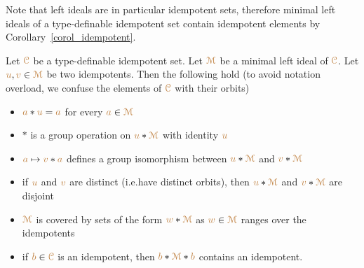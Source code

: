Note that left ideals are in particular idempotent sets, therefore minimal left ideals of a type-definable idempotent set contain idempotent elements by Corollary~\ref{corol_idempotent}.

\begin{lemma}\label{lem_leftideal}
  Let ${\color{brown}\EuScript C}$ be a type-definable idempotent set.
  Let ${\color{brown}\EuScript M}$ be a minimal left ideal of ${\color{brown}\EuScript C}$.
  Let ${\color{brown} u},{\color{brown} v}\in{\color{brown}\EuScript M}$ be two idempotents.
  Then the following hold (to avoid notation overload, we confuse the elements of ${\color{brown}\EuScript C}$ with their orbits)
  \begin{itemize}
    \item [1.] ${\color{brown} a}*{\color{brown} u}={\color{brown} a}$ for every ${\color{brown} a}\in{\color{brown}\EuScript M}$ 
    \item [2.] $*$ is a group operation on ${\color{brown} u}*{\color{brown}\EuScript M}$ with identity ${\color{brown} u}$
    \item [3.] ${\color{brown} a}\mapsto{\color{brown}v}*{\color{brown} a}$ defines a group isomorphism between ${\color{brown} u}*{\color{brown}\EuScript M}$ and ${\color{brown} v}*{\color{brown}\EuScript M}$
    \item [4.] if ${\color{brown} u}$ and ${\color{brown} v}$ are distinct (i.e.\@ have distinct orbits), then ${\color{brown} u}*{\color{brown}\EuScript M}$ and ${\color{brown} v}*{\color{brown}\EuScript M}$ are disjoint
    \item [5.] ${\color{brown}\EuScript M}$ is covered by sets of the form ${\color{brown} w}*{\color{brown}\EuScript M}$ as ${\color{brown} w}\in{\color{brown}\EuScript M}$ ranges over the idempotents
    \item [6.] if ${\color{brown} b}\in{\color{brown}\EuScript C}$ is an idempotent, then ${\color{brown} b}*{\color{brown}\EuScript M}*{\color{brown} b}$ contains an idempotent.\smallskip
  \end{itemize}
\end{lemma}


